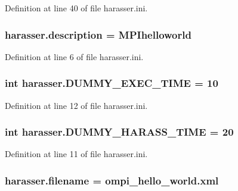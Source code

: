 Definition at line 40 of file harasser.\-ini.

\hypertarget{namespaceharasser_ae9df0d8dd5280b3f68c1594d929d77e9}{
\subsubsection[{description}]{\setlength{\rightskip}{0pt plus 5cm}harasser.\-description = M\-P\-Ihelloworld}}\label{namespaceharasser_ae9df0d8dd5280b3f68c1594d929d77e9}


Definition at line 6 of file harasser.\-ini.

\hypertarget{namespaceharasser_a3663429ea3884044eef5813de2c88893}{
\subsubsection[{D\-U\-M\-M\-Y\-\_\-\-E\-X\-E\-C\-\_\-\-T\-I\-M\-E}]{\setlength{\rightskip}{0pt plus 5cm}int harasser.\-D\-U\-M\-M\-Y\-\_\-\-E\-X\-E\-C\-\_\-\-T\-I\-M\-E = 10}}\label{namespaceharasser_a3663429ea3884044eef5813de2c88893}


Definition at line 12 of file harasser.\-ini.

\hypertarget{namespaceharasser_a5335f316caefd7dcb9a59e1541f56a10}{
\subsubsection[{D\-U\-M\-M\-Y\-\_\-\-H\-A\-R\-A\-S\-S\-\_\-\-T\-I\-M\-E}]{\setlength{\rightskip}{0pt plus 5cm}int harasser.\-D\-U\-M\-M\-Y\-\_\-\-H\-A\-R\-A\-S\-S\-\_\-\-T\-I\-M\-E = 20}}\label{namespaceharasser_a5335f316caefd7dcb9a59e1541f56a10}


Definition at line 11 of file harasser.\-ini.

\hypertarget{namespaceharasser_a8ee1446e84f466e788ff1e2b61666751}{
\subsubsection[{filename}]{\setlength{\rightskip}{0pt plus 5cm}harasser.\-filename = ompi\-\_\-hello\-\_\-world.\-xml}}\label{namespaceharasser_a8ee1446e84f466e788ff1e2b61666751}


